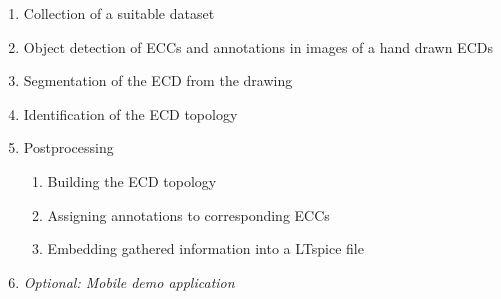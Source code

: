 \documentclass{article} %
\begin{document}
\begin{enumerate}
\item Collection of a suitable dataset
\item Object detection of ECCs and annotations in images of a hand drawn ECDs
\item Segmentation of the ECD from the drawing
\item Identification of the ECD topology
\item Postprocessing
        \begin{enumerate}
        \item Building the ECD topology
        \item Assigning annotations to corresponding ECCs
        \item Embedding gathered information into a LTspice file
        \end{enumerate}
\item \textit{Optional: Mobile demo application}
\end{enumerate}



\end{document}
